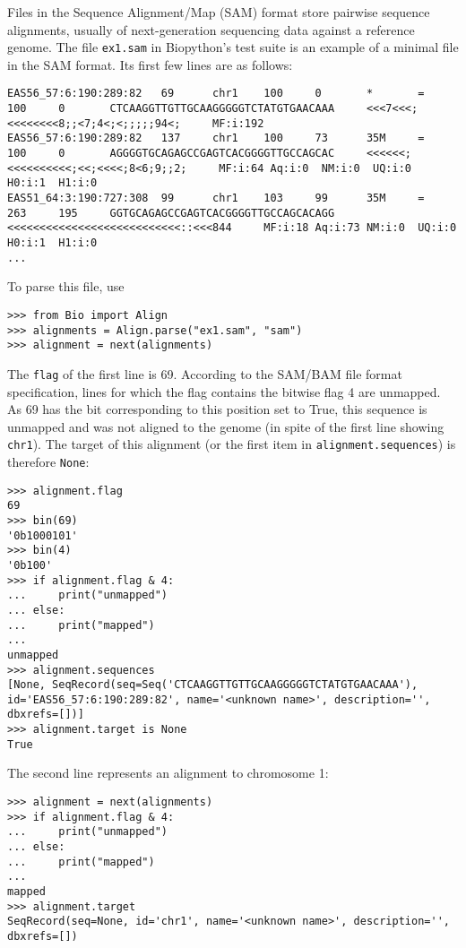 Files in the Sequence Alignment/Map (SAM) format \cite{li2009} store pairwise sequence alignments, usually of next-generation sequencing data against a reference genome. The file \verb+ex1.sam+ in Biopython's test suite is an example of a minimal file in the SAM format. Its first few lines are as follows:
\begin{verbatim}
EAS56_57:6:190:289:82   69      chr1    100     0       *       =       100     0       CTCAAGGTTGTTGCAAGGGGGTCTATGTGAACAAA     <<<7<<<;<<<<<<<<8;;<7;4<;<;;;;;94<;     MF:i:192
EAS56_57:6:190:289:82   137     chr1    100     73      35M     =       100     0       AGGGGTGCAGAGCCGAGTCACGGGGTTGCCAGCAC     <<<<<<;<<<<<<<<<<;<<;<<<<;8<6;9;;2;     MF:i:64 Aq:i:0  NM:i:0  UQ:i:0  H0:i:1  H1:i:0
EAS51_64:3:190:727:308  99      chr1    103     99      35M     =       263     195     GGTGCAGAGCCGAGTCACGGGGTTGCCAGCACAGG     <<<<<<<<<<<<<<<<<<<<<<<<<<<::<<<844     MF:i:18 Aq:i:73 NM:i:0  UQ:i:0  H0:i:1  H1:i:0
...
\end{verbatim}
To parse this file, use
\begin{verbatim}
>>> from Bio import Align
>>> alignments = Align.parse("ex1.sam", "sam")
>>> alignment = next(alignments)
\end{verbatim}
The \verb|flag| of the first line is 69. According to the SAM/BAM file format specification, lines for which the flag contains the bitwise flag 4 are unmapped. As 69 has the bit corresponding to this position set to True, this sequence is unmapped and was not aligned to the genome (in spite of the first line showing \verb|chr1|). The target of this alignment (or the first item in \verb|alignment.sequences|) is therefore \verb|None|:
\begin{verbatim}
>>> alignment.flag
69
>>> bin(69)
'0b1000101'
>>> bin(4)
'0b100'
>>> if alignment.flag & 4:
...     print("unmapped")
... else:
...     print("mapped")
...
unmapped
>>> alignment.sequences
[None, SeqRecord(seq=Seq('CTCAAGGTTGTTGCAAGGGGGTCTATGTGAACAAA'), id='EAS56_57:6:190:289:82', name='<unknown name>', description='', dbxrefs=[])]
>>> alignment.target is None
True
\end{verbatim}
The second line represents an alignment to chromosome 1:
\begin{verbatim}
>>> alignment = next(alignments)
>>> if alignment.flag & 4:
...     print("unmapped")
... else:
...     print("mapped")
...
mapped
>>> alignment.target
SeqRecord(seq=None, id='chr1', name='<unknown name>', description='', dbxrefs=[])
\end{verbatim}
